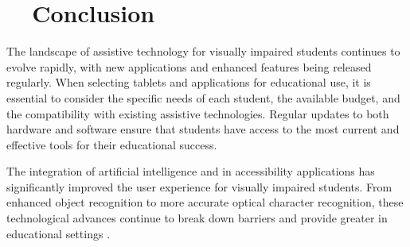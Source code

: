 \section{~~Conclusion}
\label{sec:conclusion-tablets}
The landscape of assistive technology for visually impaired students continues to evolve rapidly, with new applications and enhanced features being released regularly. When selecting tablets and applications for educational use, it is essential to consider the specific needs of each student, the available budget, and the compatibility with existing assistive technologies. Regular updates to both hardware and software ensure that students have access to the most current and effective tools for their educational success.

The integration of artificial intelligence and  in accessibility applications has significantly improved the user experience for visually impaired students. From enhanced object recognition to more accurate optical character recognition, these technological advances continue to break down barriers and provide greater  in educational settings \supercite{Bigham2014}.

